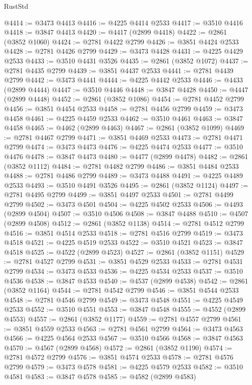 \begin{lexlean}{RustStd}
\begin{coremodule}
@4414 := @3473 @4413
@4416 := @4225 @4414 @2533
@4417 := @3510 @4416
@4418 := @3847 @4413
@4420 := @4417 (@2899 @4418)
@4422 := @2861 (@3852 @1060)
@4424 := @2781 @4422 @2799
@4426 := @3851 @4424 @2533
@4428 := @2781 @4426 @2799
@4429 := @3473 @4428
@4431 := @4225 @4429 @2533
@4433 := @3510 @4431 @3526
@4435 := @2861 (@3852 @1072)
@4437 := @2781 @4435 @2799
@4439 := @3851 @4437 @2533
@4441 := @2781 @4439 @2799
@4442 := @3473 @4441
@4444 := @4225 @4442 @2533
@4446 := @4433 (@2899 @4444)
@4447 := @3510 @4446
@4448 := @3847 @4428
@4450 := @4447 (@2899 @4448)
@4452 := @2861 (@3852 @1086)
@4454 := @2781 @4452 @2799
@4456 := @3851 @4454 @2533
@4458 := @2781 @4456 @2799
@4459 := @3473 @4458
@4461 := @4225 @4459 @2533
@4462 := @3510 @4461
@4463 := @3847 @4458
@4465 := @4462 (@2899 @4463)
@4467 := @2861 (@3852 @1099)
@4469 := @2781 @4467 @2799
@4471 := @3851 @4469 @2533
@4473 := @2781 @4471 @2799
@4474 := @3473 @4473
@4476 := @4225 @4474 @2533
@4477 := @3510 @4476
@4478 := @3847 @4473
@4480 := @4477 (@2899 @4478)
@4482 := @2861 (@3852 @1112)
@4484 := @2781 @4482 @2799
@4486 := @3851 @4484 @2533
@4488 := @2781 @4486 @2799
@4489 := @3473 @4488
@4491 := @4225 @4489 @2533
@4493 := @3510 @4491 @3526
@4495 := @2861 (@3852 @1124)
@4497 := @2781 @4495 @2799
@4499 := @3851 @4497 @2533
@4501 := @2781 @4499 @2799
@4502 := @3473 @4501
@4504 := @4225 @4502 @2533
@4506 := @4493 (@2899 @4504)
@4507 := @3510 @4506
@4508 := @3847 @4488
@4510 := @4507 (@2899 @4508)
@4512 := @2861 (@3852 @1138)
@4514 := @2781 @4512 @2799
@4516 := @3851 @4514 @2533
@4518 := @2781 @4516 @2799
@4519 := @3473 @4518
@4521 := @4225 @4519 @2533
@4522 := @3510 @4521
@4523 := @3847 @4518
@4525 := @4522 (@2899 @4523)
@4527 := @2861 (@3852 @1151)
@4529 := @2781 @4527 @2799
@4531 := @3851 @4529 @2533
@4533 := @2781 @4531 @2799
@4534 := @3473 @4533
@4536 := @4225 @4534 @2533
@4537 := @3510 @4536
@4538 := @3847 @4533
@4540 := @4537 (@2899 @4538)
@4542 := @2861 (@3852 @1164)
@4544 := @2781 @4542 @2799
@4546 := @3851 @4544 @2533
@4548 := @2781 @4546 @2799
@4549 := @3473 @4548
@4551 := @4225 @4549 @2533
@4552 := @3510 @4551
@4553 := @3847 @4548
@4555 := @4552 (@2899 @4553)
@4557 := @2861 (@3852 @1177)
@4559 := @2781 @4557 @2799
@4561 := @3851 @4559 @2533
@4563 := @2781 @4561 @2799
@4564 := @3473 @4563
@4566 := @4225 @4564 @2533
@4567 := @3510 @4566
@4568 := @3847 @4563
@4570 := @4567 (@2899 @4568)
@4572 := @2861 (@3852 @1190)
@4574 := @2781 @4572 @2799
@4576 := @3851 @4574 @2533
@4578 := @2781 @4576 @2799
@4579 := @3473 @4578
@4581 := @4225 @4579 @2533
@4582 := @3510 @4581
@4583 := @3847 @4578
@4585 := @4582 (@2899 @4583)

\end{coremodule}
\end{lexlean}
